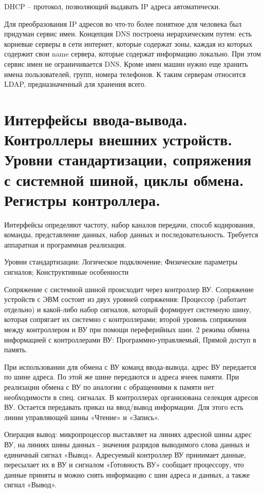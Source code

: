 \documentclass{article}
\begin{document}
DHCP – протокол, позволяющий выдавать IP адреса автоматически. 

Для преобразования IP адресов во что-то более понятное для человека был придуман сервис имен. Концепция DNS построена иерархическим путем: есть корневые серверы в сети интернет, которые содержат зоны, каждая из которых содержит свои name сервера, которые содержат информацию локально.
При этом сервис имен не ограничивается DNS. Кроме имен машин нужно еще хранить имена пользователей, групп, номера телефонов. К таким серверам относится LDAP, предназначенный для хранения всего. 

\section{Интерфейсы ввода-вывода. Контроллеры внешних устройств. Уровни стандартизации, сопряжения с системной шиной, циклы обмена. Регистры контроллера.}
Интерфейсы определяют частоту, набор каналов передачи, способ кодирования, команды, представление данных, набор данных и последовательность.
Требуется аппаратная и программная реализация.

Уровни стандартизации: Логическое подключение; Физические параметры сигналов; Конструктивные особенности

Сопряжение с системной шиной происходит через контроллер ВУ. Сопряжение устройств с ЭВМ состоит из двух уровней сопряжения: Процессор (работает отдельно) и какой-либо набор сигналов, который формирует системную шину, которая сопрягает их системно с контроллерами; второй уровень сопряжения между контроллером и ВУ при помощи переферийных шин.
2 режима обмена информацией с контроллерами ВУ: Программно-управляемый, Прямой доступ в память. 


При использовании для обмена с ВУ команд ввода-вывода, адрес ВУ передается по шине адреса. 
По этой же шине передаются и адреса ячеек памяти.
При реализации обмена с ВУ по аналогии с обращениями к памяти нет необходимости в спец. сигналах. 
В контроллерах организована селекция адресов ВУ. 
Остается передавать приказ на ввод/вывод информации. 
Для этого есть линии управляющей шины «Чтение» и «Запись».


Операция вывод: микропроцессор выставляет на линиях адресной шины адрес ВУ, на линиях шины данных - значения разрядов выводимого слова данных и единичный сигнал «Вывод». 
Адресуемый контроллер ВУ принимает данные, пересылает их в ВУ и сигналом «Ґотовность ВУ»
сообщает процессору, что данные приняты и можно снять информацию с шин адреса и данных, а также сигнал «Вывод».
\end{document}

